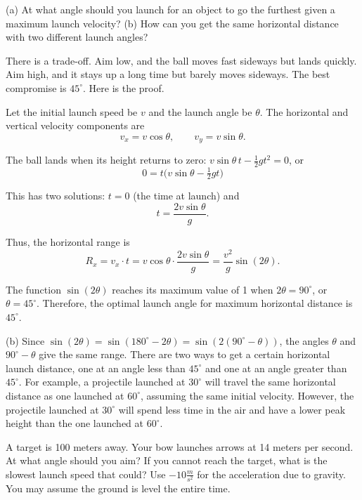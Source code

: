 \begin{Exercise}[title=Launch Angle for Maximum Range, label=projectiles_angle2]
(a) At what angle should you launch for an object to go the furthest given a maximum launch velocity? 
(b) How can you get the same horizontal distance with two different launch angles?
\end{Exercise}
\begin{Answer}[ref=projectiles_angle2]
There is a trade-off. Aim low, and the ball moves
fast sideways but lands quickly. Aim high, and it stays up a long time but
barely moves sideways. The best compromise is $45^\circ$. Here is the
proof.

Let the initial launch speed be $v$ and the launch angle be $\theta$. The horizontal and vertical velocity components are
\[
v_x = v \cos\theta, \qquad v_y = v \sin\theta.
\]

The ball lands when its height returns to zero: $v \sin\theta \, t -
\frac{1}{2} g t^2 = 0$, or
\[
0 = t\Big(v \sin\theta - \tfrac{1}{2} g t\Big)
\]

This has two solutions: $t = 0$ (the time at launch) and
\[
t = \frac{2 v \sin\theta}{g}.
\]

Thus, the horizontal range is
\[
R_x = v_x \cdot t = v \cos\theta \cdot \frac{2 v \sin\theta}{g}
    = \frac{v^2}{g} \sin(2\theta).
\]

The function $\sin(2\theta)$ reaches its maximum value of 1 when $2\theta = 90^\circ$, or $\theta = 45^\circ$. Therefore, the optimal launch angle for maximum horizontal distance is $45^\circ$.

(b) Since $\sin(2\theta) = \sin(180^\circ - 2\theta) = \sin(2(90^\circ -
\theta))$, the angles $\theta$ and $90^\circ - \theta$ give the same range. There are two ways to get a certain horizontal launch distance, one at an angle less than $45^\circ$ and one at an angle greater than $45^\circ$. For example, a projectile launched at $30^\circ$ will travel the same horizontal distance as one launched at $60^\circ$, assuming the same initial velocity. However, the projectile launched at $30^\circ$ will spend less time in the air and have a lower peak height than the one launched at $60^\circ$.
\end{Answer}

\begin{Exercise}[title=Projectile Motion at an angle, label=projectiles_angle3]
A target is 100 meters away. Your bow launches arrows at 14 meters per
second. At what angle should you aim? If you cannot reach the target,
what is the slowest launch speed that could? Use $-10 \frac{m}{s^2}$ for the acceleration due to gravity. You may assume the ground is level the entire time.
\end{Exercise}

